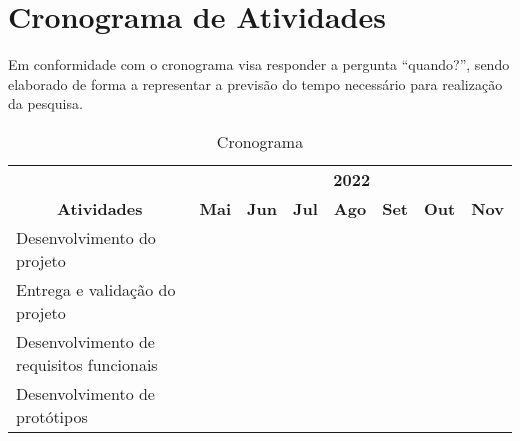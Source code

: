\section{Cronograma de Atividades} \label{sec:schedule_activities_table}

Em conformidade com \citep[p. 128]{LAKATOS2021:metodologia} o cronograma
visa responder a pergunta “quando?”, sendo elaborado de forma a
representar a previsão do tempo necessário para realização da pesquisa.

\begin{table}[H]
    \caption{Cronograma}
    \begin{tabular}{|p{7cm}|l|l|l|l|l|l|l|}
        \hline
        \multicolumn{1}{|c|}{}                                      & \multicolumn{7}{c|}{\textbf{2022}}                                                                                                                                                                   \\ \cline{2-8}
        \multicolumn{1}{|c|}{\multirow{-2}{*}{\textbf{Atividades}}} & \textbf{Mai}                       & \textbf{Jun}             & \textbf{Jul}             & \textbf{Ago}             & \textbf{Set}             & \textbf{Out}             & \textbf{Nov}             \\ \hline
        Desenvolvimento do projeto                                  & \cellcolor[HTML]{000000}           & \cellcolor[HTML]{000000} &                          &                          &                          &                          &                          \\ \hline
        Entrega e validação do projeto                              &                                    & \cellcolor[HTML]{000000} &                          &                          &                          &                          &                          \\ \hline
        Desenvolvimento de requisitos funcionais                    &                                    & \cellcolor[HTML]{000000} &                          &                          &                          &                          &                          \\ \hline
        Desenvolvimento de protótipos                               &                                    & \cellcolor[HTML]{000000} & \cellcolor[HTML]{000000} &                          &                          &                          &                          \\ \hline

\end{tabular}
\end{table}
